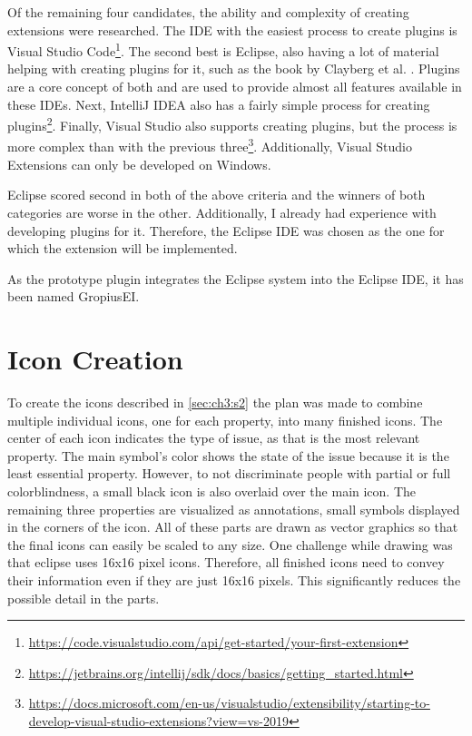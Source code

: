 Of the remaining four candidates, the ability and complexity of creating extensions were researched.
The \gls{IDE} with the easiest process to create plugins is Visual Studio Code\footnote{\url{https://code.visualstudio.com/api/get-started/your-first-extension}}.
The second best is \gls{Eclipse}, also having a lot of material helping with creating plugins for it, such as the book by Clayberg et al. \cite{clayberg2006eclipse}.
Plugins are a core concept of both and are used to provide almost all features available in these \glspl{IDE}.
Next, IntelliJ IDEA also has a fairly simple process for creating plugins\footnote{\url{https://jetbrains.org/intellij/sdk/docs/basics/getting_started.html}}.
Finally, Visual Studio also supports creating plugins, but the process is more complex than with the previous three\footnote{\url{https://docs.microsoft.com/en-us/visualstudio/extensibility/starting-to-develop-visual-studio-extensions?view=vs-2019}}.
Additionally, Visual Studio Extensions can only be developed on Windows.

\Gls{Eclipse} scored second in both of the above criteria and the winners of both categories are worse in the other.
Additionally, I already had experience with developing plugins for it.
Therefore, the \gls{Eclipse} \gls{IDE} was chosen as the one for which the extension will be implemented.

As the prototype plugin integrates the \gls{Eclipse} system into the \gls{Eclipse} \gls{IDE}, it has been named \gls{GropiusEI}.

\section{Icon Creation}
\label{sec:ch4:s2}
To create the icons described in \cref{sec:ch3:s2} the plan was made to combine multiple individual icons, one for each property, into many finished icons.
The center of each icon indicates the type of issue, as that is the most relevant property.
The main symbol's color shows the state of the issue because it is the least essential property.
However, to not discriminate people with partial or full colorblindness, a small black icon is also overlaid over the main icon.
The remaining three properties are visualized as annotations, small symbols displayed in the corners of the icon.
All of these parts are drawn as vector graphics so that the final icons can easily be scaled to any size.
One challenge while drawing was that eclipse uses 16x16 pixel icons.
Therefore, all finished icons need to convey their information even if they are just 16x16 pixels.
This significantly reduces the possible detail in the parts.

